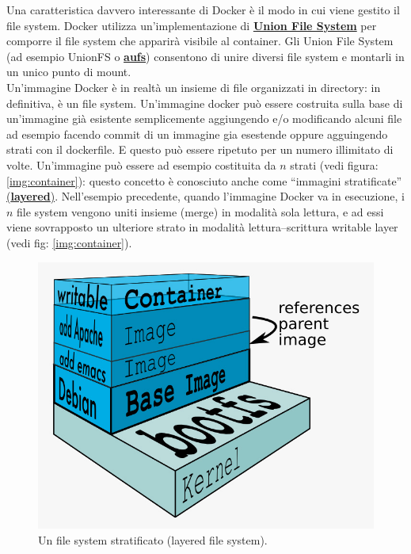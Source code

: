Una caratteristica davvero interessante di Docker è il modo in cui viene gestito il file system. Docker utilizza un’implementazione di \href{https://en.wikipedia.org/wiki/UnionFS}{\textbf{Union File System}} per comporre il file system che apparirà visibile al container. Gli Union File System (ad esempio UnionFS o \href{https://en.wikipedia.org/wiki/Aufs}{\textbf{aufs}}) consentono di unire diversi file system e montarli in un unico punto di mount.\\
Un'immagine Docker è in realtà un insieme di file organizzati in directory: in definitiva, è un file system. Un'immagine docker può essere costruita sulla base di un'immagine già esistente semplicemente aggiungendo e/o modificando alcuni file ad esempio facendo commit di un immagine gia esestende oppure agguingendo strati con il dockerfile. E questo può essere ripetuto per un numero illimitato di volte. Un'immagine può essere ad esempio costituita da $n$ strati (vedi figura: \ref{img:container}): questo concetto è conosciuto anche come “immagini stratificate” \href{http://goo.gl/z1ne3Q}{(\textbf{layered})}. Nell’esempio precedente, quando l’immagine Docker va in esecuzione, i $n$ file system vengono uniti insieme (merge) in modalità sola lettura, e ad essi viene sovrapposto un ulteriore strato in modalità lettura–scrittura writable layer (vedi fig: \ref{img:container}).
\begin{figure}[H]
	\begin{center}
		\includegraphics[width=0.99\columnwidth]{img/ContainersOperations-2_fig02.jpg}
		\caption{Un file system stratificato (layered file system).}
		\label{img:layered}
	\end{center}
\end{figure}
